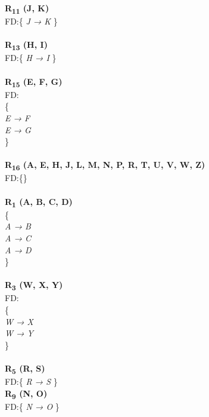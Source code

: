 \begin{adjustwidth}{2cm}{}
\textbf{R\textsubscript{11} (J, K)}\\
FD:\{
\textit{ 
J → K 
}
\} \\ \\

\noindent
\textbf{R\textsubscript{13} (H, I)}\\
FD:\{
\textit{ 
H → I 
}
\} \\ \\

\noindent
\textbf{R\textsubscript{15} (E, F, G)}\\
FD:\\
\{\\
\textit{ 
E → F\\
E → G\\
}
\} \\ \\

\noindent
\textbf{R\textsubscript{16} (A, E, H, J, L, M, N, P, R, T, U, V, W, Z)}\\
FD:\{\} \\ \\

\noindent
\textbf{R\textsubscript{1} (A, B, C, D)}\\
\{\\ 
\textit{
A → B\\
A → C\\
A → D\\
} 
\}\\ \\

\noindent
\textbf{R\textsubscript{3} (W, X, Y)}\\
FD:\\
\{\\
\textit{ 
W → X\\
W → Y\\ 
}
\} \\ \\

\noindent
\textbf{R\textsubscript{5} (R, S)}\\
FD:\{
\textit{ 
R → S 
}
\} \\

\noindent
\textbf{R\textsubscript{9} (N, O)}\\
FD:\{
\textit{ 
N → O 
}
\} \\


\end{adjustwidth} 




\clearpage